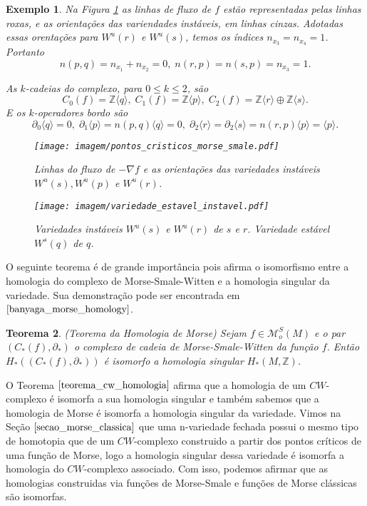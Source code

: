 \documentclass[12pt]{book}
\newtheorem{teorema}{Teorema}[section]
\newtheorem{exemplo}[teorema]{Exemplo}
\newcommand{\bordo}[1]{\partial_{#1}}
\newcommand{\funcoesmorsesmale}[1]{\mathcal{M}^{S}_{o}(#1)}
\newcommand{\gerador}[1]{\langle #1\rangle}
\newcommand{\gradiente}{\nabla f}
\newcommand{\inteiros}{\mathbb{Z}}
\newcommand{\variedadeinstavel}[1]{W^{u}(#1)}
\begin{document}
\begin{exemplo}
		Na Figura \ref{figura_fluxo_morse_smale} as linhas de fluxo de $f$ estão representadas pelas linhas roxas, e as orientações das variendades instáveis, em linhas cinzas. Adotadas essas orentações para $\variedadeinstavel{r}$ e $\variedadeinstavel{s}$, temos os índices $n_{x_{3}} =n_{x_{4}}= 1$. Portanto 
		$$
		n(p,q) = n_{x_{1}}+n_{x_{2}} = 0,\; n(r,p) = n(s,p)=n_{x_{3}}= 1. 
		$$
		
		As $k$-cadeias do complexo, para $0\leq k\leq 2$, são
		$$
		C_{0}(f) = \inteiros\gerador{q},\; C_{1}(f) = \inteiros\gerador{p},\; C_{2}(f) = \inteiros\gerador{r}\oplus\inteiros\gerador{s}.
		$$
		E os $k$-operadores bordo são
		$$
		\bordo{0}\gerador{q} =0,\; \bordo{1}\gerador{p}=n(p,q)\gerador{q} = 0,\; \bordo{2}\gerador{r}=\bordo{2}\gerador{s} = n(r,p)\gerador{p} = \gerador{p}.
		$$
		
		\begin{figure}[!h]
			\centering
			\texttt{[image: imagem/pontos\_cristicos\_morse\_smale.pdf]}
			\caption{Linhas do fluxo de $-\gradiente$ e as orientações das variedades instáveis $W^{u}(s), W^{u}(p)$ e $W^{u}(r)$.}
			\label{figura_fluxo_morse_smale}
		\end{figure}
		
		
		\begin{figure}[!h]
			\centering
			\texttt{[image: imagem/variedade\_estavel\_instavel.pdf]}
			\caption{Variedades instáveis $W^{u}(s)$ e $W^{u}(r)$ de $s$ e $r$. Variedade estável $W^{s}(q)$ de $q$.}
			\label{figura_variedade_estavel_instavel}
		\end{figure}
	\end{exemplo}

	
	O seguinte teorema é de grande importância pois afirma o isomorfismo entre a homologia do complexo de Morse-Smale-Witten e a homologia singular da variedade. Sua demonstração pode ser encontrada em $\cite{banyaga_morse_homology}$.
	
	\begin{teorema}
		(Teorema da Homologia de Morse) Sejam $f \in \funcoesmorsesmale{M}$ e o par $(C_{*}(f), \partial_{*})$ o complexo de cadeia de Morse-Smale-Witten da função $f$. Então $H_{*}((C_{*}(f), \partial_{*})) $ é isomorfo a homologia singular $ H_{*}(M, \inteiros)$.
	\end{teorema}
	
	O Teorema $\ref{teorema_cw_homologia}$ afirma que a homologia de um $CW$-complexo é isomorfa a sua homologia singular e também sabemos que a homologia de Morse é isomorfa a homologia singular da variedade. Vimos na Seção $\ref{secao_morse_classica}$ que uma n-variedade fechada possui o mesmo tipo de homotopia que de um $CW$-complexo construido a partir dos pontos críticos de uma função de Morse, logo a homologia singular dessa variedade é isomorfa a homologia do $CW$-complexo associado. Com isso, podemos afirmar que as homologias construidas via funções de Morse-Smale e funções de Morse clássicas são isomorfas.
	
\end{document}
